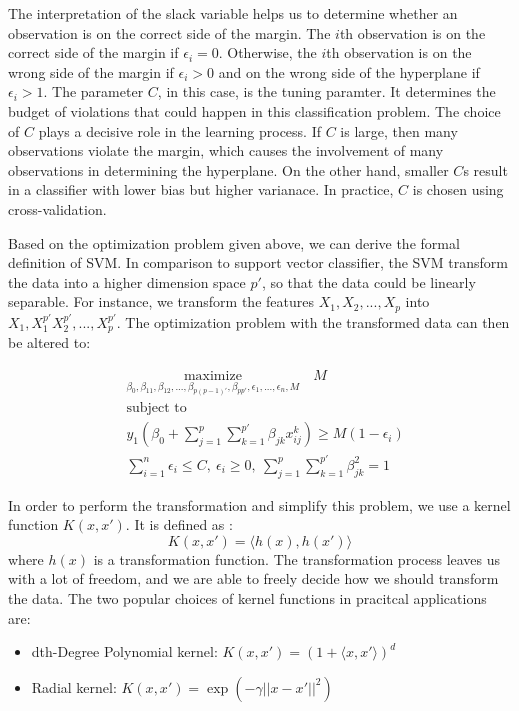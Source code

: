 The interpretation of the slack variable helps us to determine whether an observation is on the correct side of the margin.
The $i$th observation is on the correct side of the margin if $\epsilon_i = 0$. Otherwise, 
the $i$th observation is on the wrong side of the margin if $\epsilon_i > 0$ and on the wrong side of the hyperplane
if $\epsilon_i > 1$. The parameter $C$, in this case, is the tuning paramter. It determines the budget of violations
that could happen in this classification problem. The choice of $C$ plays a decisive role in the learning process.
If $C$ is large, then many observations violate the margin, which causes the involvement of many observations in 
determining the hyperplane. On the other hand, smaller $C$s result in a classifier with lower bias but higher varianace.
In practice, $C$ is chosen using cross-validation. 

Based on the optimization problem given above, we can derive the formal definition of SVM. In comparison to 
support vector classifier, the SVM transform the data into a higher dimension space $p'$, so that the data could be
linearly separable. For instance, we transform the features $X_1, X_2, ..., X_p$ into $X_1, X_1^{p'} X_2^{p'}, ..., X_p^{p'}$.
The optimization problem with the transformed data can then be altered to\cite{R9}: 

\begin{equation}
    \begin{aligned}
      & \underset{\textstyle {\beta_0, \beta_{11}, \beta_{12}, ..., \beta_{p(p-1)'}, \beta_{pp'}, \epsilon_1, ..., \epsilon_n, M}}{\text{maximize}} \quad
        M \\
      & \text{subject to} \\
      & y_1(\beta_0 + \sum_{j=1}^p \sum_{k=1}^{p'} \beta_{jk}x_{ij}^k )\geq M (1-\epsilon_i) \\
      & \sum_{i=1}^n\epsilon_i \leq C,\  \epsilon_i \geq 0, \ \sum_{j=1}^p\sum_{k=1}^{p'}\beta_{jk}^2 = 1
    \end{aligned}
\end{equation}

In order to perform the transformation and simplify this problem, we use a kernel function $K(x, x')$. It is defined as \cite{Elements12}:
\begin{equation}
    K(x, x') = \langle h(x), h(x') \rangle
\end{equation}
where $h(x)$ is a transformation function. 
The transformation process leaves us with a lot of freedom, and we are able to freely decide how we should transform the
data. The two popular choices of kernel functions in pracitcal applications are:
\begin{itemize}
    \item dth-Degree Polynomial kernel: $K(x, x') = (1 + \langle x, x' \rangle)^d$
    \item Radial kernel: $K(x, x') = \exp(-\gamma ||x - x'||^2)$
\end{itemize}

